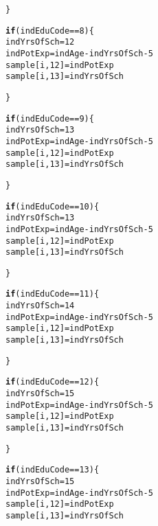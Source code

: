 \documentclass{article}\usepackage[]{graphicx}\usepackage[]{color}
\makeatletter
\newcommand{\hlnum}[1]{\textcolor[rgb]{0.686,0.059,0.569}{#1}}%
\newcommand{\hlopt}[1]{\textcolor[rgb]{0,0,0}{#1}}%
\newcommand{\hlstd}[1]{\textcolor[rgb]{0.345,0.345,0.345}{#1}}%
\newcommand{\hlkwa}[1]{\textcolor[rgb]{0.161,0.373,0.58}{\textbf{#1}}}%
\newcommand{\hlkwb}[1]{\textcolor[rgb]{0.69,0.353,0.396}{#1}}%
\newenvironment{kframe}{%
 \def\at@end@of@kframe{}%
 \ifinner\ifhmode%
  \def\at@end@of@kframe{\end{minipage}}%
  \begin{minipage}{\columnwidth}%
 \fi\fi%
 \def\FrameCommand##1{\hskip\@totalleftmargin \hskip-\fboxsep
 \colorbox{shadecolor}{##1}\hskip-\fboxsep
     \hskip-\linewidth \hskip-\@totalleftmargin \hskip\columnwidth}%
 \MakeFramed {\advance\hsize-\width
   \@totalleftmargin\z@ \linewidth\hsize
   \@setminipage}}%
 {\par\unskip\endMakeFramed%
 \at@end@of@kframe}
\newenvironment{knitrout}{}{} %
\makeatother
\begin{document}
\begin{knitrout}
\begin{kframe}
\begin{alltt}
    \hlstd{\}}

    \hlkwa{if} \hlstd{(indEduCode} \hlopt{==} \hlnum{8}\hlstd{)\{}
      \hlstd{indYrsOfSch} \hlkwb{=} \hlnum{12}
      \hlstd{indPotExp} \hlkwb{=} \hlstd{indAge} \hlopt{-} \hlstd{indYrsOfSch} \hlopt{-} \hlnum{5}
      \hlstd{sample[i,}\hlnum{12}\hlstd{]} \hlkwb{=} \hlstd{indPotExp}
      \hlstd{sample[i,}\hlnum{13}\hlstd{]} \hlkwb{=} \hlstd{indYrsOfSch}

    \hlstd{\}}

    \hlkwa{if} \hlstd{(indEduCode} \hlopt{==} \hlnum{9}\hlstd{)\{}
      \hlstd{indYrsOfSch} \hlkwb{=} \hlnum{13}
      \hlstd{indPotExp} \hlkwb{=} \hlstd{indAge} \hlopt{-} \hlstd{indYrsOfSch} \hlopt{-} \hlnum{5}
      \hlstd{sample[i,}\hlnum{12}\hlstd{]} \hlkwb{=} \hlstd{indPotExp}
      \hlstd{sample[i,}\hlnum{13}\hlstd{]} \hlkwb{=} \hlstd{indYrsOfSch}

    \hlstd{\}}

    \hlkwa{if} \hlstd{(indEduCode} \hlopt{==} \hlnum{10}\hlstd{)\{}
      \hlstd{indYrsOfSch} \hlkwb{=} \hlnum{13}
      \hlstd{indPotExp} \hlkwb{=} \hlstd{indAge} \hlopt{-} \hlstd{indYrsOfSch} \hlopt{-} \hlnum{5}
      \hlstd{sample[i,}\hlnum{12}\hlstd{]} \hlkwb{=} \hlstd{indPotExp}
      \hlstd{sample[i,}\hlnum{13}\hlstd{]} \hlkwb{=} \hlstd{indYrsOfSch}

    \hlstd{\}}

    \hlkwa{if} \hlstd{(indEduCode} \hlopt{==} \hlnum{11}\hlstd{)\{}
      \hlstd{indYrsOfSch} \hlkwb{=} \hlnum{14}
      \hlstd{indPotExp} \hlkwb{=} \hlstd{indAge} \hlopt{-} \hlstd{indYrsOfSch} \hlopt{-} \hlnum{5}
      \hlstd{sample[i,}\hlnum{12}\hlstd{]} \hlkwb{=} \hlstd{indPotExp}
      \hlstd{sample[i,}\hlnum{13}\hlstd{]} \hlkwb{=} \hlstd{indYrsOfSch}

    \hlstd{\}}

    \hlkwa{if} \hlstd{(indEduCode} \hlopt{==} \hlnum{12}\hlstd{)\{}
      \hlstd{indYrsOfSch} \hlkwb{=} \hlnum{15}
      \hlstd{indPotExp} \hlkwb{=} \hlstd{indAge} \hlopt{-} \hlstd{indYrsOfSch} \hlopt{-} \hlnum{5}
      \hlstd{sample[i,}\hlnum{12}\hlstd{]} \hlkwb{=} \hlstd{indPotExp}
      \hlstd{sample[i,}\hlnum{13}\hlstd{]} \hlkwb{=} \hlstd{indYrsOfSch}

    \hlstd{\}}

    \hlkwa{if} \hlstd{(indEduCode} \hlopt{==} \hlnum{13}\hlstd{)\{}
      \hlstd{indYrsOfSch} \hlkwb{=} \hlnum{15}
      \hlstd{indPotExp} \hlkwb{=} \hlstd{indAge} \hlopt{-} \hlstd{indYrsOfSch} \hlopt{-} \hlnum{5}
      \hlstd{sample[i,}\hlnum{12}\hlstd{]} \hlkwb{=} \hlstd{indPotExp}
      \hlstd{sample[i,}\hlnum{13}\hlstd{]} \hlkwb{=} \hlstd{indYrsOfSch}


\end{alltt}
\end{kframe}
\end{knitrout}
\end{document}
